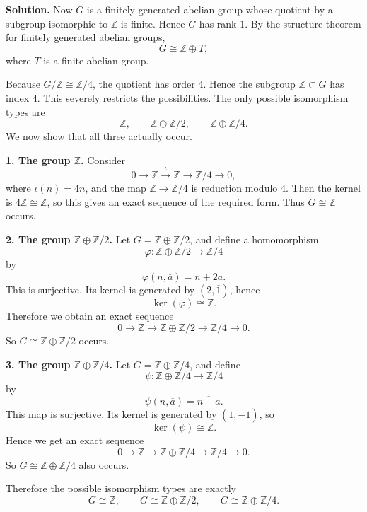 \documentclass[12pt,a4paper]{article}
\theoremstyle{notespace}
\begin{document}
\noindent\textbf{Solution.}
Now \(G\) is a finitely generated abelian group whose quotient by a subgroup isomorphic to \(\mathbb Z\) is finite. Hence \(G\) has rank \(1\). By the structure theorem for finitely generated abelian groups,
\[
G\cong \mathbb Z\oplus T,
\]
where \(T\) is a finite abelian group.

Because \(G/\mathbb Z\cong \mathbb Z/4\), the quotient has order \(4\). Hence the subgroup \(\mathbb Z\subset G\) has index \(4\). This severely restricts the possibilities. The only possible isomorphism types are
\[
\mathbb Z,\qquad \mathbb Z\oplus \mathbb Z/2,\qquad \mathbb Z\oplus \mathbb Z/4.
\]
We now show that all three actually occur.

\medskip

\noindent
\textbf{1. The group \(\mathbb Z\).}
Consider
\[
0\longrightarrow \mathbb Z \overset{\iota}{\longrightarrow} \mathbb Z \longrightarrow \mathbb Z/4 \longrightarrow 0,
\]
where \(\iota(n)=4n\), and the map \(\mathbb Z\to \mathbb Z/4\) is reduction modulo \(4\). Then the kernel is \(4\mathbb Z\cong \mathbb Z\), so this gives an exact sequence of the required form. Thus \(G\cong \mathbb Z\) occurs.

\medskip

\noindent
\textbf{2. The group \(\mathbb Z\oplus \mathbb Z/2\).}
Let \(G=\mathbb Z\oplus \mathbb Z/2\), and define a homomorphism
\[
\varphi:\mathbb Z\oplus \mathbb Z/2\to \mathbb Z/4
\]
by
\[
\varphi(n,\overline a)=\overline{n+2a}.
\]
This is surjective. Its kernel is generated by \((2,\overline 1)\), hence
\[
\ker(\varphi)\cong \mathbb Z.
\]
Therefore we obtain an exact sequence
\[
0\longrightarrow \mathbb Z \longrightarrow \mathbb Z\oplus \mathbb Z/2 \longrightarrow \mathbb Z/4 \longrightarrow 0.
\]
So \(G\cong \mathbb Z\oplus \mathbb Z/2\) occurs.

\medskip

\noindent
\textbf{3. The group \(\mathbb Z\oplus \mathbb Z/4\).}
Let \(G=\mathbb Z\oplus \mathbb Z/4\), and define
\[
\psi:\mathbb Z\oplus \mathbb Z/4\to \mathbb Z/4
\]
by
\[
\psi(n,\overline a)=\overline{n+a}.
\]
This map is surjective. Its kernel is generated by \((1,\overline{-1})\), so
\[
\ker(\psi)\cong \mathbb Z.
\]
Hence we get an exact sequence
\[
0\longrightarrow \mathbb Z \longrightarrow \mathbb Z\oplus \mathbb Z/4 \longrightarrow \mathbb Z/4 \longrightarrow 0.
\]
So \(G\cong \mathbb Z\oplus \mathbb Z/4\) also occurs.

Therefore the possible isomorphism types are exactly
\[
\boxed{
	G\cong \mathbb Z,
	\qquad
	G\cong \mathbb Z\oplus \mathbb Z/2,
	\qquad
	G\cong \mathbb Z\oplus \mathbb Z/4.
}
\]
\end{document}
